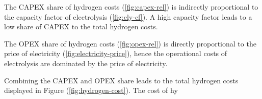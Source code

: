 \clearpage
The CAPEX share of hydrogen costs (\ref{fig:capex-rel}) is indirectly proportional to the capacity factor of electrolysis (\ref{fig:ely-cf}). A high capacity factor leads to a low share of CAPEX to the total hydrogen costs.

The OPEX share of hydrogen costs (\ref{fig:opex-rel}) is directly proportional to the price of electricity (\ref{fig:electricity-price}), hence the operational costs of electrolysis are dominated by the price of electricity.

Combining the CAPEX and OPEX share leads to the total hydrogen costs displayed in Figure (\ref{fig:hydrogen-cost}). The cost of hy


